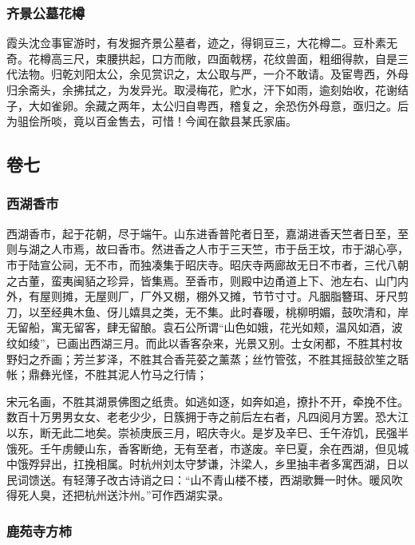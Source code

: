 \documentclass[]{article}
\begin{document}
\hypertarget{header-n509}{%
\subsubsection{齐景公墓花樽}\label{header-n509}}

霞头沈佥事宦游时，有发掘齐景公墓者，迹之，得铜豆三，大花樽二。豆朴素无奇。花樽高三尺，束腰拱起，口方而敞，四面戟楞，花纹兽面，粗细得款，自是三代法物。归乾刘阳太公，余见赏识之，太公取与严，一介不敢请。及宦粤西，外母归余斋头，余拂拭之，为发异光。取浸梅花，贮水，汗下如雨，逾刻始收，花谢结子，大如雀卵。余藏之两年，太公归自粤西，稽复之，余恐伤外母意，亟归之。后为驵侩所啖，竟以百金售去，可惜！今闻在歙县某氏家庙。

\hypertarget{header-n513}{%
\subsection{卷七}\label{header-n513}}

\hypertarget{header-n515}{%
\subsubsection{西湖香市}\label{header-n515}}

西湖香市，起于花朝，尽于端午。山东进香普陀者日至，嘉湖进香天竺者日至，至则与湖之人市焉，故曰香市。然进香之人市于三天竺，市于岳王坟，市于湖心亭，市于陆宣公祠，无不市，而独凑集于昭庆寺。昭庆寺两廊故无日不市者，三代八朝之古董，蛮夷闽貊之珍异，皆集焉。至香市，则殿中边甬道上下、池左右、山门内外，有屋则摊，无屋则厂，厂外又棚，棚外又摊，节节寸寸。凡胭脂簪珥、牙尺剪刀，以至经典木鱼、伢儿嬉具之类，无不集。此时春暖，桃柳明媚，鼓吹清和，岸无留船，寓无留客，肆无留酿。袁石公所谓``山色如娥，花光如颊，温风如酒，波纹如绫''，已画出西湖三月。而此以香客杂来，光景又别。士女闲都，不胜其村妆野妇之乔画；芳兰芗泽，不胜其合香芫荽之薰蒸；丝竹管弦，不胜其摇鼓欱笙之聒帐；鼎彝光怪，不胜其泥人竹马之行情；

宋元名画，不胜其湖景佛图之纸贵。如逃如逐，如奔如追，撩扑不开，牵挽不住。数百十万男男女女、老老少少，日簇拥于寺之前后左右者，凡四阅月方罢。恐大江以东，断无此二地矣。崇祯庚辰三月，昭庆寺火。是岁及辛巳、壬午洊饥，民强半饿死。壬午虏鲠山东，香客断绝，无有至者，市遂废。辛巳夏，余在西湖，但见城中饿殍舁出，扛挽相属。时杭州刘太守梦谦，汴梁人，乡里抽丰者多寓西湖，日以民词馈送。有轻薄子改古诗诮之曰：``山不青山楼不楼，西湖歌舞一时休。暖风吹得死人臭，还把杭州送汴州。''可作西湖实录。

\hypertarget{header-n520}{%
\subsubsection{鹿苑寺方柿}\label{header-n520}}
\end{document}
